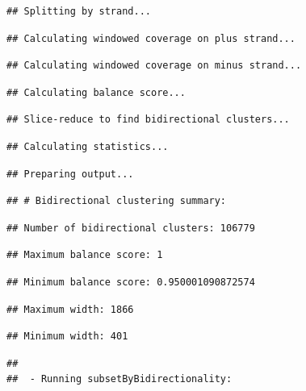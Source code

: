 \documentclass[9pt,a4paper,]{extarticle}
\begin{document}
\begin{verbatim}
## Splitting by strand...
\end{verbatim}

\begin{verbatim}
## Calculating windowed coverage on plus strand...
\end{verbatim}

\begin{verbatim}
## Calculating windowed coverage on minus strand...
\end{verbatim}

\begin{verbatim}
## Calculating balance score...
\end{verbatim}

\begin{verbatim}
## Slice-reduce to find bidirectional clusters...
\end{verbatim}

\begin{verbatim}
## Calculating statistics...
\end{verbatim}

\begin{verbatim}
## Preparing output...
\end{verbatim}

\begin{verbatim}
## # Bidirectional clustering summary:
\end{verbatim}

\begin{verbatim}
## Number of bidirectional clusters: 106779
\end{verbatim}

\begin{verbatim}
## Maximum balance score: 1
\end{verbatim}

\begin{verbatim}
## Minimum balance score: 0.950001090872574
\end{verbatim}

\begin{verbatim}
## Maximum width: 1866
\end{verbatim}

\begin{verbatim}
## Minimum width: 401
\end{verbatim}

\begin{verbatim}
## 
##  - Running subsetByBidirectionality:
\end{verbatim}
\end{document}
